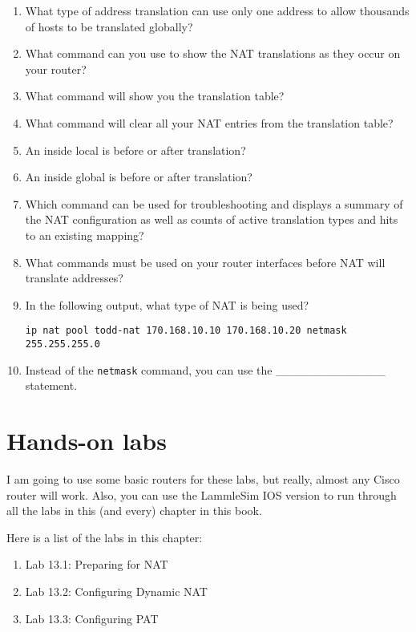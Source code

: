 \begin{enumerate}
\item
  What type of address translation can use only one address to allow
  thousands of hosts to be translated globally?
\item
  What command can you use to show the NAT translations as they occur on
  your router?
\item
  What command will show you the translation table?
\item
  What command will clear all your NAT entries from the translation
  table?
\item
  An inside local is before or after translation?
\item
  An inside global is before or after translation?
\item
  Which command can be used for troubleshooting and displays a summary
  of the NAT configuration as well as counts of active translation types
  and hits to an existing mapping?
\item
  What commands must be used on your router interfaces before NAT will
  translate addresses?
\item
  In the following output, what type of NAT is being used?

\begin{verbatim}
ip nat pool todd-nat 170.168.10.10 170.168.10.20 netmask 255.255.255.0
\end{verbatim}
\item
  Instead of the \texttt{netmask} command, you can use the
  \_\_\_\_\_\_\_\_\_\_\_\_\_ statement.
\end{enumerate}




\section{Hands-on labs}

I am going to use some basic routers for these labs, but really, almost
any Cisco router will work. Also, you can use the LammleSim IOS version
to run through all the labs in this (and every) chapter in this book.

Here is a list of the labs in this chapter:

\begin{enumerate}
\tightlist
\item
  Lab 13.1: Preparing for NAT
\item
  Lab 13.2: Configuring Dynamic NAT
\item
  Lab 13.3: Configuring PAT
\end{enumerate}

